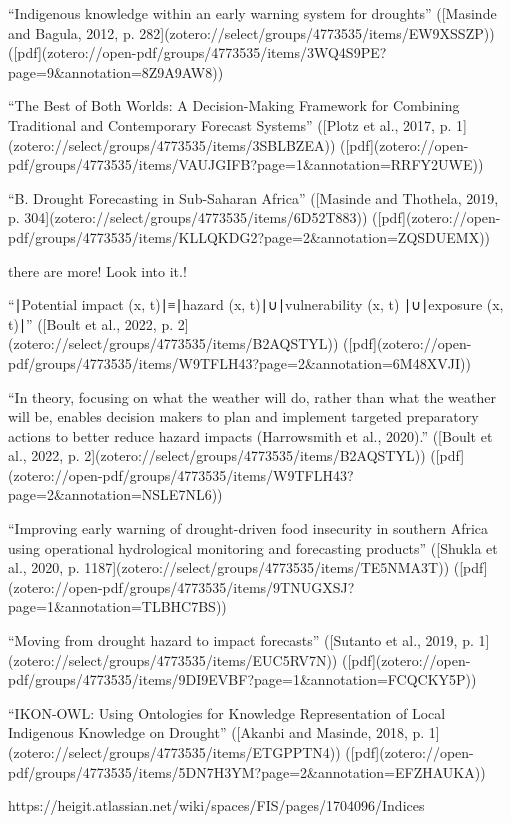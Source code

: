 {“Indigenous knowledge within an early warning system for droughts” ([Masinde and Bagula, 2012, p. 282](zotero://select/groups/4773535/items/EW9XSSZP)) ([pdf](zotero://open-pdf/groups/4773535/items/3WQ4S9PE?page=9&annotation=8Z9A9AW8))

“The Best of Both Worlds: A Decision-Making Framework for Combining Traditional and Contemporary Forecast Systems” ([Plotz et al., 2017, p. 1](zotero://select/groups/4773535/items/3SBLBZEA)) ([pdf](zotero://open-pdf/groups/4773535/items/VAUJGIFB?page=1&annotation=RRFY2UWE))

“B. Drought Forecasting in Sub-Saharan Africa” ([Masinde and Thothela, 2019, p. 304](zotero://select/groups/4773535/items/6D52T883)) ([pdf](zotero://open-pdf/groups/4773535/items/KLLQKDG2?page=2&annotation=ZQSDUEMX))

there are more! Look into it.!

“∣Potential impact (x, t)∣≡∣hazard (x, t)∣∪∣vulnerability (x, t) ∣∪∣exposure (x, t)∣” ([Boult et al., 2022, p. 2](zotero://select/groups/4773535/items/B2AQSTYL)) ([pdf](zotero://open-pdf/groups/4773535/items/W9TFLH43?page=2&annotation=6M48XVJI))

“In theory, focusing on what the weather will do, rather than what the weather will be, enables decision makers to plan and implement targeted preparatory actions to better reduce hazard impacts (Harrowsmith et al., 2020).” ([Boult et al., 2022, p. 2](zotero://select/groups/4773535/items/B2AQSTYL)) ([pdf](zotero://open-pdf/groups/4773535/items/W9TFLH43?page=2&annotation=NSLE7NL6))

“Improving early warning of drought-driven food insecurity in southern Africa using operational hydrological monitoring and forecasting products” ([Shukla et al., 2020, p. 1187](zotero://select/groups/4773535/items/TE5NMA3T)) ([pdf](zotero://open-pdf/groups/4773535/items/9TNUGXSJ?page=1&annotation=TLBHC7BS))

“Moving from drought hazard to impact forecasts” ([Sutanto et al., 2019, p. 1](zotero://select/groups/4773535/items/EUC5RV7N)) ([pdf](zotero://open-pdf/groups/4773535/items/9DI9EVBF?page=1&annotation=FCQCKY5P))

“IKON-OWL: Using Ontologies for Knowledge Representation of Local Indigenous Knowledge on Drought” ([Akanbi and Masinde, 2018, p. 1](zotero://select/groups/4773535/items/ETGPPTN4)) ([pdf](zotero://open-pdf/groups/4773535/items/5DN7H3YM?page=2&annotation=EFZHAUKA))

https://heigit.atlassian.net/wiki/spaces/FIS/pages/1704096/Indices

}
